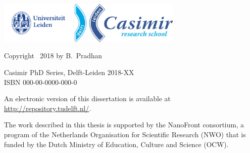 \begin{titlepage}
\vfill
\begin{center}
    \includegraphics[height=0.8in]{frontback/logos/leiden}
    \hspace{2em}
    \includegraphics[height=0.8in]{frontback/logos/casimir} \\
\end{center}
\vfill

\vspace{2\bigskipamount}

\noindent Copyright \textcopyright\ 2018 by B.~Pradhan


\medskip
\noindent Casimir PhD Series, Delft-Leiden 2018-XX \\
\noindent ISBN 000-00-0000-000-0

\medskip
\noindent An electronic version of this dissertation is available at \\
\url{http://repository.tudelft.nl/}.

\medskip
\noindent The work described in this thesis is supported by the NanoFront consortium, a program of the Netherlands Organisation for Scientific Research (NWO) that is funded by the Dutch Ministry of Education, Culture and Science (OCW).

\end{titlepage}

